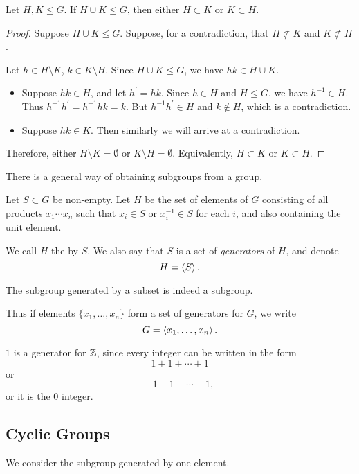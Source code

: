 \begin{proposition}
Let $H,K\le G$. If $H\cup K\le G$, then either $H\subset K$ or $K\subset H$.
\end{proposition}

\begin{proof}
Suppose $H\cup K\le G$. Suppose, for a contradiction, that $H\not\subset K$ and $K\not\subset H$. 

Let $h\in H\setminus K$, $k\in K\setminus H$. Since $H\cup K\le G$, we have $hk\in H\cup K$.
\begin{itemize}
\item Suppose $hk\in H$, and let $h^\prime=hk$. Since $h\in H$ and $H\le G$, we have $h^{-1}\in H$. Thus $h^{-1}h^\prime=h^{-1}hk=k$. But $h^{-1}h^\prime\in H$ and $k\notin H$, which is a contradiction.   
\item Suppose $hk\in K$. Then similarly we will arrive at a contradiction.
\end{itemize}
Therefore, either $H\setminus K=\emptyset$ or $K\setminus H=\emptyset$. Equivalently, $H\subset K$ or $K\subset H$.
\end{proof}

There is a general way of obtaining subgroups from a group. 

\begin{definition}
Let $S\subset G$ be non-empty. Let $H$ be the set of elements of $G$ consisting of all products $x_1\cdots x_n$ such that $x_i\in S$ or $x_i^{-1}\in S$ for each $i$, and also containing the unit element.

We call $H$ the  by $S$. We also say that $S$ is a set of \emph{generators} of $H$, and denote
\[H=\left\langle S\right\rangle.\]
\end{definition}

\begin{lemma*}
The subgroup generated by a subset is indeed a subgroup.
\end{lemma*}

Thus if elements $\{x_1,\dots,x_n\}$ form a set of generators for $G$, we write
\[G=\left\langle x_1,\dots,x_n\right\rangle.\]

\begin{example}
$1$ is a generator for $\mathbb Z$, since every integer can be written in the form
\[1+1+\cdots+1\]
or
\[-1-1-\cdots-1,\]
or it is the $0$ integer.
\end{example}

\subsection{Cyclic Groups}
We consider the subgroup generated by one element.

